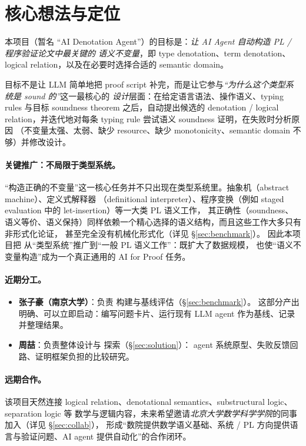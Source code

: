 \section{核心想法与定位}
\label{sec:idea}

本项目（暂名 ``AI Denotation Agent''）的目标是：\emph{让 AI Agent 自动构造 PL / 程序验证论文中最关键的
语义不变量}，即 type denotation、term denotation、logical relation，以及在必要时选择合适的 semantic domain。

目标不是让 LLM 简单地把 proof script 补完，而是让它参与\emph{``为什么这个类型系统是 sound 的''}这一最核心的
\emph{设计}层面：在给定语言语法、操作语义、typing rules 与目标 soundness theorem 之后，自动提出候选的
denotation / logical relation，并迭代地对每条 typing rule 尝试语义 soundness 证明，在失败时分析原因
（不变量太强、太弱、缺少 resource、缺少 monotonicity、semantic domain 不够）并修改设计。

\paragraph{关键推广：不局限于类型系统。}
``构造正确的不变量''这一核心任务并不只出现在类型系统里。抽象机（abstract machine）、定义式解释器
（definitional interpreter）、程序变换（例如 staged evaluation 中的 let-insertion）等一大类 PL 语义工作，
其正确性（soundness、语义等价、语义保持）同样依赖一个精心选择的语义结构，而且这些工作大多只有非形式化论证，
甚至完全没有机械化形式化（详见 \S\ref{sec:benchmark}）。
因此本项目把 \benchmark{} 从``类型系统''推广到``一般 PL 语义工作''：既扩大了数据规模，
也使``语义不变量构造''成为一个真正通用的 AI for Proof 任务。

\paragraph{近期分工。}
\begin{itemize}
  \item \textbf{张子豪（南京大学）}：负责 \benchmark{} 构建与基线评估（\S\ref{sec:benchmark}）。
        这部分产出明确、可以立即启动：编写问题卡片、运行现有 LLM agent 作为基线、记录并整理结果。
  \item \textbf{周喆}：负责整体设计与 \solution{} 探索（\S\ref{sec:solution}）：
        agent 系统原型、失败反馈回路、证明框架负担的比较研究。
\end{itemize}

\paragraph{远期合作。}
该项目天然连接 logical relation、denotational semantics、substructural logic、separation logic 等
数学与逻辑内容，未来希望邀请\emph{北京大学数学科学学院}的同事加入（详见 \S\ref{sec:collab}），
形成``数院提供数学语义基础、系统 / PL 方向提供语言与验证问题、AI agent 提供自动化''的合作闭环。
